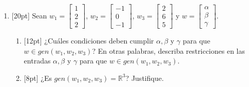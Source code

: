 \documentclass[11pt]{article}
\begin{document}
\begin{enumerate}
\item{}[20pt] Sean $w_1 = \begin{bmatrix}1\\2\\2\end{bmatrix}$, $w_2 = \begin{bmatrix}-1\\0\\-1\end{bmatrix}$, $w_3 = \begin{bmatrix}2\\6\\5\end{bmatrix}$ y $w = \begin{bmatrix}\alpha\\\beta\\\gamma\end{bmatrix}$.
\begin{enumerate}
\item{}[12pt] ¿Cuáles condiciones deben cumplir $\alpha, \beta$ y $\gamma$ para que $w\in gen(w_1,w_2,w_3)$? En otras palabras, describa restricciones en las entradas $\alpha, \beta$ y $\gamma$ para que $w\in gen(w_1,w_2,w_3)$.

\vspace{6cm}

\item{}[8pt] ¿Es $gen(w_1,w_2,w_3)=\mathbb{R}^3$? Justifique.

\vspace{4cm}
\end{enumerate}
\end{enumerate}

\examfooter
\end{document}
